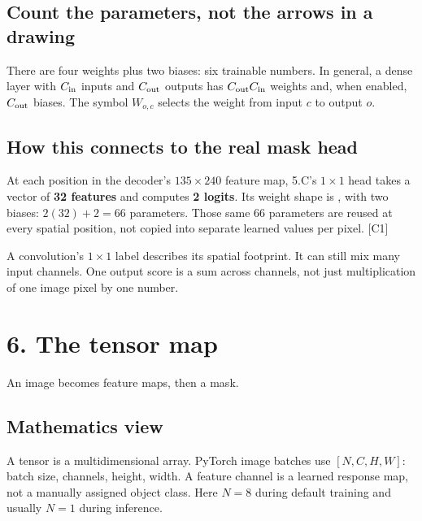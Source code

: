 \documentclass[11pt,letterpaper]{article}
\newcommand{\code}[1]{\texttt{\detokenize{#1}}}
\newcommand{\note}[1]{\par\vspace{3pt}\begingroup\setlength{\fboxsep}{8pt}%
 \colorbox{pale}{\parbox{\dimexpr\linewidth-2\fboxsep\relax}{#1}}\endgroup\par\vspace{3pt}}
\newcommand{\guidepage}[2]{\clearpage\pdfbookmark[0]{#1}{guide-\thepage}\section*{#1}{\sffamily\color{muted}#2}\par\vspace{5pt}}
\begin{document}
\subsection*{Count the parameters, not the arrows in a drawing}
There are four weights plus two biases: six trainable numbers. In general, a dense layer with $C_{\rm in}$ inputs and $C_{\rm out}$ outputs has $C_{\rm out}C_{\rm in}$ weights and, when enabled, $C_{\rm out}$ biases. The symbol $W_{o,c}$ selects the weight from input $c$ to output $o$.

\subsection*{How this connects to the real mask head}
At each position in the decoder's $135\times240$ feature map, 5.C's $1\times1$ head takes a vector of \textbf{32 features} and computes \textbf{2 logits}. Its weight shape is \code{[2, 32, 1, 1]}, with two biases: $2(32)+2=66$ parameters. Those same 66 parameters are reused at every spatial position, not copied into separate learned values per pixel. [C1]

\note{A convolution's $1\times1$ label describes its spatial footprint. It can still mix many input channels. One output score is a sum across channels, not just multiplication of one image pixel by one number.}

\guidepage{6. The tensor map}{An image becomes feature maps, then a mask.}
\subsection*{Mathematics view}
A tensor is a multidimensional array. PyTorch image batches use $[N,C,H,W]$: batch size, channels, height, width. A feature channel is a learned response map, not a manually assigned object class. Here $N=8$ during default training and usually $N=1$ during inference.
\end{document}
